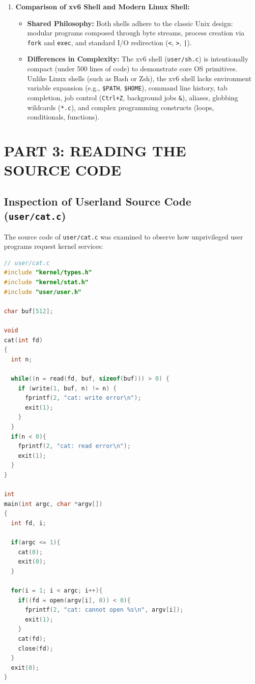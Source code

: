 \documentclass[12pt,a4paper]{report}
\numberwithin{equation}{chapter}
\numberwithin{figure}{chapter}
\numberwithin{table}{chapter}
\begin{document}
\begin{enumerate}
    \item \textbf{Comparison of xv6 Shell and Modern Linux Shell:}
    \begin{itemize}
        \item \textbf{Shared Philosophy:} Both shells adhere to the classic Unix design: modular programs composed through byte streams, process creation via \texttt{fork} and \texttt{exec}, and standard I/O redirection (\texttt{<}, \texttt{>}, \texttt{|}).
        \item \textbf{Differences in Complexity:} The xv6 shell (\texttt{user/sh.c}) is intentionally compact (under 500 lines of code) to demonstrate core OS primitives. Unlike Linux shells (such as Bash or Zsh), the xv6 shell lacks environment variable expansion (e.g., \texttt{\$PATH}, \texttt{\$HOME}), command line history, tab completion, job control (\texttt{Ctrl+Z}, background jobs \texttt{\&}), aliases, globbing wildcards (\texttt{*.c}), and complex programming constructs (loops, conditionals, functions).
    \end{itemize}
\end{enumerate}

\chapter{PART 3: READING THE SOURCE CODE}

\section{Inspection of Userland Source Code (\texttt{user/cat.c})}
The source code of \texttt{user/cat.c} was examined to observe how unprivileged user programs request kernel services:

\begin{lstlisting}[language=c]
// user/cat.c
#include "kernel/types.h"
#include "kernel/stat.h"
#include "user/user.h"

char buf[512];

void
cat(int fd)
{
  int n;

  while((n = read(fd, buf, sizeof(buf))) > 0) {
    if (write(1, buf, n) != n) {
      fprintf(2, "cat: write error\n");
      exit(1);
    }
  }
  if(n < 0){
    fprintf(2, "cat: read error\n");
    exit(1);
  }
}

int
main(int argc, char *argv[])
{
  int fd, i;

  if(argc <= 1){
    cat(0);
    exit(0);
  }

  for(i = 1; i < argc; i++){
    if((fd = open(argv[i], 0)) < 0){
      fprintf(2, "cat: cannot open %s\n", argv[i]);
      exit(1);
    }
    cat(fd);
    close(fd);
  }
  exit(0);
}
\end{lstlisting}
\end{document}
